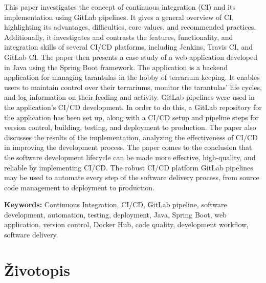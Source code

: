 \documentclass[a4paper,12pt,oneside]{article}
\begin{document}
This paper investigates the concept of continuous integration (CI) and its implementation using GitLab pipelines.  It gives a general overview of CI, highlighting its advantages, difficulties, core values, and recommended practices. Additionally, it investigates and contrasts the features, functionality, and integration skills of several CI/CD platforms, including Jenkins, Travis CI, and GitLab CI. The paper then presents a case study of a web application developed in Java using the Spring Boot framework. The application is a backend application for managing tarantulas in the hobby of terrarium keeping.  It enables users to maintain control over their terrariums, monitor the tarantulas' life cycles, and log information on their feeding and activity. GitLab pipelines were used in the application's CI/CD development. In order to do this, a GitLab repository for the application has been set up, along with a CI/CD setup and pipeline steps for version control, building, testing, and deployment to production. The paper also discusses the results of the implementation, analyzing the effectiveness of CI/CD in improving the development process. The paper comes to the conclusion that the software development lifecycle can be made more effective, high-quality, and reliable by implementing CI/CD. The robust CI/CD platform GitLab pipelines may be used to automate every step of the software delivery process, from source code management to deployment to production. 

\bigskip
\noindent\textbf{Keywords:}  Continuous Integration, CI/CD, GitLab pipeline, software development, automation, testing, deployment, Java, Spring Boot, web application, version control, Docker Hub, code quality, development workflow, software delivery.

\newpage

\printbibliography[heading=bibintoc]
\nocite{duvall-2007-continuous}
\nocite{brent-2020-CI/CD}
\nocite{van2023continuous}
\nocite{humble2010continuous}
\nocite{kim2016devops}
\nocite{cowell2023automating}
\nocite{vinto2022gitops}
\nocite{dejonghe2020nginx}
\nocite{kane2023docker}
\nocite{leszko2019continuous}
\nocite{rawat2023ci}
\nocite{challenges}
\nocite{pr_Blirnan1999}
\nocite{atlassian_ci_tools}
\nocite{katalon_ci_tools}
\nocite{ci_tools_slika}
\nocite{top_7_ci_tools}
\nocite{gitlab_vs_jenkins_BrowserStack}
\newpage
\section*{Životopis}
\end{document}
